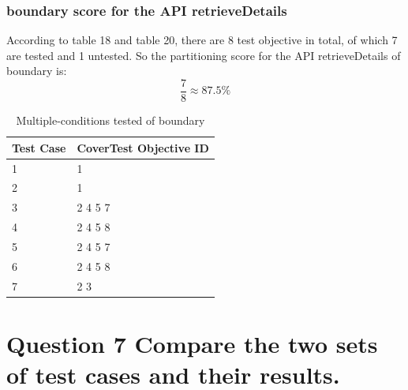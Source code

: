 \documentclass{article}
\begin{document}
\subsubsection{boundary score for the API retrieveDetails}
According to table 18 and table 20, there are 8 test objective in total, of which 7 are tested and 1 untested. So the partitioning score for the API retrieveDetails of boundary is:
$$\frac{7}{8}\approx87.5\%$$
\begin{longtable}{|p{2cm}|p{8cm}|}
\caption{Multiple-conditions tested of boundary}\\
\hline 
Test Case& CoverTest Objective ID\\
\hline  
1&1\\
\hline
2&1\\
\hline
3&2 4 5 7\\
\hline
4&2 4 5 8\\
\hline
5&2 4 5 7\\
\hline
6&2 4 5 8\\
\hline
7&2 3\\
\hline
\end{longtable}

\section{Question 7 Compare the two sets of test cases and their results.}
\enddocument
\end{document}
